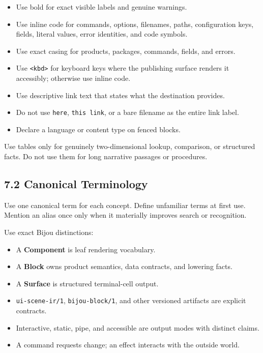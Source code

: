 \begin{itemize}
\tightlist
\item
  Use bold for exact visible labels and genuine warnings.
\item
  Use inline code for commands, options, filenames, paths, configuration keys, fields, literal values, error identities, and code symbols.
\item
  Use exact casing for products, packages, commands, fields, and errors.
\item
  Use \texttt{<\allowbreak{}k\allowbreak{}b\allowbreak{}d\allowbreak{}>} for keyboard keys where the publishing surface renders it accessibly; otherwise use inline code.
\item
  Use descriptive link text that states what the destination provides.
\item
  Do not use \texttt{h\allowbreak{}e\allowbreak{}r\allowbreak{}e}, \texttt{t\allowbreak{}h\allowbreak{}i\allowbreak{}s\allowbreak{} \allowbreak{}l\allowbreak{}i\allowbreak{}n\allowbreak{}k}, or a bare filename as the entire link label.
\item
  Declare a language or content type on fenced blocks.
\end{itemize}

Use tables only for genuinely two-dimensional lookup, comparison, or structured facts. Do not use them for long narrative passages or procedures.

\subsection{7.2 Canonical Terminology}\label{record-005-canonical-terminology}

Use one canonical term for each concept. Define unfamiliar terms at first use. Mention an alias once only when it materially improves search or recognition.

Use exact Bijou distinctions:

\begin{itemize}
\tightlist
\item
  A \textbf{Component} is leaf rendering vocabulary.
\item
  A \textbf{Block} owns product semantics, data contracts, and lowering facts.
\item
  A \textbf{Surface} is structured terminal-cell output.
\item
  \texttt{u\allowbreak{}i\allowbreak{}-\allowbreak{}s\allowbreak{}c\allowbreak{}e\allowbreak{}n\allowbreak{}e\allowbreak{}-\allowbreak{}i\allowbreak{}r\allowbreak{}/\allowbreak{}1}, \texttt{b\allowbreak{}i\allowbreak{}j\allowbreak{}o\allowbreak{}u\allowbreak{}-\allowbreak{}b\allowbreak{}l\allowbreak{}o\allowbreak{}c\allowbreak{}k\allowbreak{}/\allowbreak{}1}, and other versioned artifacts are explicit contracts.
\item
  Interactive, static, pipe, and accessible are output modes with distinct claims.
\item
  A command requests change; an effect interacts with the outside world.
\end{itemize}

